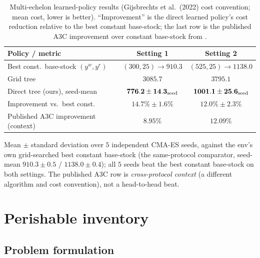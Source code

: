 \documentclass[11pt]{article}
\begin{document}
\begin{table}[!htbp]
\centering
\caption{Multi-echelon learned-policy results (Gijsbrechts et al.\ (2022) cost convention; mean cost,
lower is better). ``Improvement'' is the direct learned policy's cost reduction relative to the best
constant base-stock; the last row is the published A3C improvement over constant base-stock from
\citet{gijsbrechts2022drl}.}
\label{tab:me-results}
\begin{tabular}{lcc}
\toprule
Policy / metric & Setting 1 & Setting 2 \\
\midrule
Best const.\ base-stock $(y^w,y^r)$ & $(300,25)\to 910.3$ & $(525,25)\to 1138.0$ \\
Grid tree & $3085.7$ & $3795.1$ \\
Direct tree (ours), seed-mean & $\mathbf{776.2\pm14.3_{\rm seed}}$ & $\mathbf{1001.1\pm25.6_{\rm seed}}$ \\
Improvement vs.\ best const. & $\mathbf{14.7\%\pm1.6\%}$ & $\mathbf{12.0\%\pm2.3\%}$ \\
Published A3C improvement (context) & $8.95\%$ & $12.09\%$ \\
\bottomrule
\end{tabular}
\par\medskip\footnotesize Mean $\pm$ standard deviation over $5$ independent CMA-ES seeds, against the
env's own grid-searched best constant base-stock (the same-protocol comparator, seed-mean
$910.3\pm0.5$ / $1138.0\pm0.4$); all $5$ seeds beat the best constant base-stock on both settings. The published A3C row is
\emph{cross-protocol context} (a different algorithm and cost convention), not a head-to-head beat.
\end{table}
\FloatBarrier

\section{Perishable inventory}
\label{sec:perishable}

\subsection{Problem formulation}
\label{sec:perishable-formulation}
\end{document}
